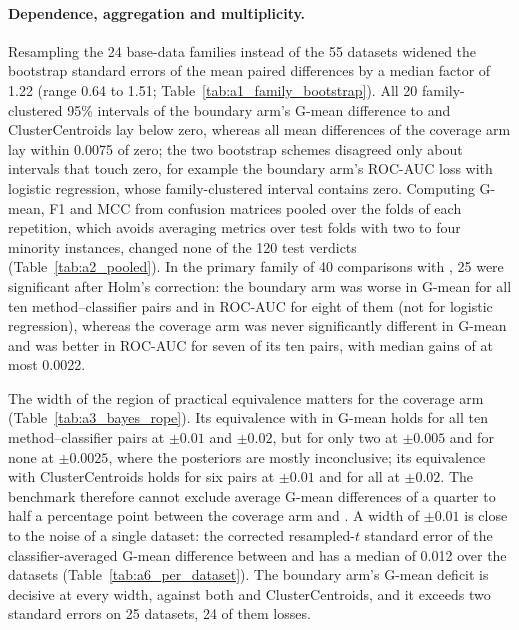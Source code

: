 \paragraph{Dependence, aggregation and multiplicity.} Resampling the 24 base-data families instead of the 55 datasets widened the bootstrap standard errors of the mean paired differences by a median factor of 1.22 (range 0.64 to 1.51; Table~\ref{tab:a1_family_bootstrap}). All 20 family-clustered 95\% intervals of the boundary arm's G-mean difference to \RUS{} and ClusterCentroids lay below zero, whereas all mean differences of the coverage arm lay within 0.0075 of zero; the two bootstrap schemes disagreed only about intervals that touch zero, for example the boundary arm's ROC-AUC loss with logistic regression, whose family-clustered interval contains zero. Computing G-mean, F1 and MCC from confusion matrices pooled over the folds of each repetition, which avoids averaging metrics over test folds with two to four minority instances, changed none of the 120 test verdicts (Table~\ref{tab:a2_pooled}). In the primary family of 40 comparisons with \RUS, 25 were significant after Holm's correction: the boundary arm was worse in G-mean for all ten method--classifier pairs and in ROC-AUC for eight of them (not for logistic regression), whereas the coverage arm was never significantly different in G-mean and was better in ROC-AUC for seven of its ten pairs, with median gains of at most 0.0022.

The width of the region of practical equivalence matters for the coverage arm (Table~\ref{tab:a3_bayes_rope}). Its equivalence with \RUS{} in G-mean holds for all ten method--classifier pairs at $\pm0.01$ and $\pm0.02$, but for only two at $\pm0.005$ and for none at $\pm0.0025$, where the posteriors are mostly inconclusive; its equivalence with ClusterCentroids holds for six pairs at $\pm0.01$ and for all at $\pm0.02$. The benchmark therefore cannot exclude average G-mean differences of a quarter to half a percentage point between the coverage arm and \RUS. A width of $\pm0.01$ is close to the noise of a single dataset: the corrected resampled-$t$ standard error of the classifier-averaged G-mean difference between \MUSCS{} and \RUS{} has a median of 0.012 over the datasets (Table~\ref{tab:a6_per_dataset}). The boundary arm's G-mean deficit is decisive at every width, against both \RUS{} and ClusterCentroids, and it exceeds two standard errors on 25 datasets, 24 of them losses.

